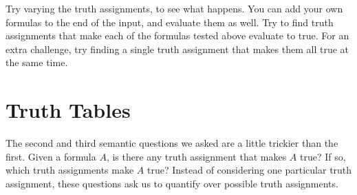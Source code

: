 \documentclass[letterpaper,10pt,english]{sphinxmanual}
\begin{document}
\begin{sphinxVerbatim}[commandchars=\\\{\}]

   
   
   
   
   

     \PYG{o}{[} \PYG{o}{]}   
     

       
    
      
        

\end{sphinxVerbatim}

\sphinxAtStartPar
Try varying the truth assignments, to see what happens. You can add your own formulas to the end of the input, and evaluate them as well. Try to find truth assignments that make each of the formulas tested above evaluate to true. For an extra challenge, try finding a single truth assignment that makes them all true at the same time.


\section{Truth Tables}
\label{\detokenize{semantics_of_propositional_logic:truth-tables}}
\sphinxAtStartPar
The second and third semantic questions we asked are a little trickier than the first. Given a formula \(A\), is there any truth assignment that makes \(A\) true? If so, which truth assignments make \(A\) true? Instead of considering one particular truth assignment, these questions ask us to quantify over  possible truth assignments.
\end{document}
